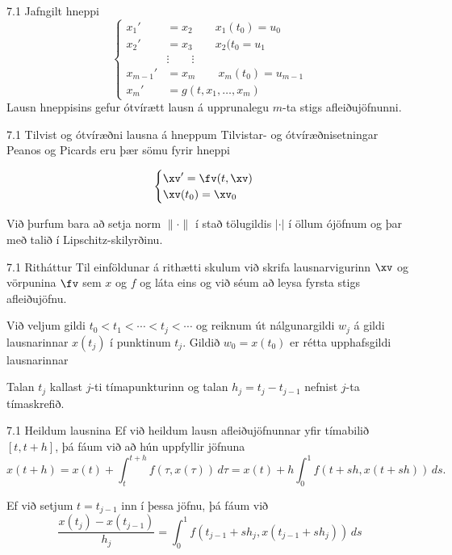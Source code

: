 \begin{frame}{7.1 Jafngilt hneppi} 
\begin{equation*}
\begin{cases}
x_1' &= x_2 \qquad x_1(t_0) = u_0\\
x_2' &= x_3 \qquad x_2(t_0 = u_1\\
&\vdots \qquad \vdots\\
x_{m-1}' &= x_m \qquad x_m(t_0) = u_{m-1}\\
x_m' &= g(t,x_1, \ldots , x_m)
\end{cases}
\end{equation*}
Lausn hneppisins gefur ótvírætt lausn á upprunalegu $m$-ta stigs 
afleiðujöfnunni.
\end{frame}


\begin{frame}{7.1 Tilvist og ótvíræðni lausna á hneppum} 
Tilvistar- og ótvíræðnisetningar Peanos og  Picards 
eru þær sömu fyrir hneppi

\begin{equation*}
\begin{cases}
\xv' =\fv(t,\xv)\\
\xv(t_0) = \xv_0
\end{cases}
\end{equation*}

\pause
\smallskip
Við þurfum bara að 
setja norm $\|\cdot\|$ í stað tölugildis $|\cdot|$ í öllum ójöfnum og
þar með talið í Lipschitz-skilyrðinu.
\end{frame}


\begin{frame}{7.1 Ritháttur} 
Til einföldunar á rithætti skulum við skrifa lausnarvigurinn $\xv$ 
og vörpunina $\fv$ sem $x$ og $f$ og láta eins og við séum að leysa 
fyrsta stigs afleiðujöfnu.

\pause
\smallskip
Við veljum gildi $t_0 < t_1 < \cdots < t_j<\cdots$ og reiknum út
nálgunargildi $w_j$ á gildi lausnarinnar $x(t_j)$ í punktinum
$t_j$.   Gildið $w_0=x(t_0)$ er rétta upphafsgildi lausnarinnar 

\smallskip
Talan $t_j$ kallast $j$-ti tímapunkturinn og talan
$h_j=t_j-t_{j-1}$ nefnist $j$-ta tímaskrefið.
\end{frame}


\begin{frame}{7.1 Heildum lausnina}
Ef við heildum lausn afleiðujöfnunnar yfir tímabilið 
$[t,t+h]$, þá fáum við að hún uppfyllir jöfnuna
$$
x(t+h)=x(t)+\int_t^{t+h}f(\tau,x(\tau))\, d\tau
=x(t)+h\int_0^1f(t+sh,x(t+sh))\, ds.
$$

\pause
\smallskip
Ef við setjum $t=t_{j-1}$ inn í þessa jöfnu, þá fáum við
$$
\dfrac{x(t_j)-x(t_{j-1})}{h_j}=\int_0^1f(t_{j-1}+sh_j,x(t_{j-1}+sh_j))\, ds
$$
\end{frame}


